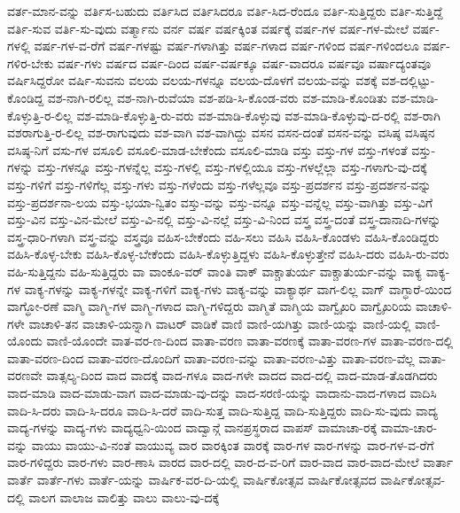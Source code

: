 {ವರ್ತ-ಮಾನ-ವನ್ನು
ವರ್ತಿಸ-ಬಹುದು
ವರ್ತಿಸಿದ
ವರ್ತಿಸಿದರೂ
ವರ್ತಿ-ಸಿದ-ರೆಂದೂ
ವರ್ತಿ-ಸುತ್ತಿದ್ದರು
ವರ್ತಿ-ಸುತ್ತಿದ್ದೆ
ವರ್ತಿ-ಸುವ
ವರ್ತಿ-ಸು-ವುದು
ವರ್ತ್ಮಾನು
ವರ್ನ
ವರ್ಷ
ವರ್ಷಕ್ಕಿಂತ
ವರ್ಷಕ್ಕೆ
ವರ್ಷ-ಗಳ
ವರ್ಷ-ಗಳ-ಮೇಲೆ
ವರ್ಷ-ಗಳಲ್ಲಿ
ವರ್ಷ-ಗಳ-ವ-ರೆಗೆ
ವರ್ಷ-ಗಳಷ್ಟು
ವರ್ಷ-ಗಳಾಗಿತ್ತು
ವರ್ಷ-ಗಳಾದ
ವರ್ಷ-ಗಳಿಂದ
ವರ್ಷ-ಗಳಿಂದಲೂ
ವರ್ಷ-ಗಳಿರ-ಬೇಕು
ವರ್ಷ-ಗಳು
ವರ್ಷದ
ವರ್ಷ-ದಿಂದ
ವರ್ಷ-ವರ್ಷಕ್ಕೂ
ವರ್ಷ-ವಾದರೂ
ವರ್ಷವೂ
ವರ್ಷಾದ್ಯಂತವೂ
ವರ್ಷಿಸಿದ್ದರೋ
ವರ್ಷಿ-ಸುವನು
ವಲಯ
ವಲಯ-ಗಳನ್ನೂ
ವಲಯ-ದೊಳಗೆ
ವಲಯ-ವನ್ನು
ವಶಕ್ಕೆ
ವಶ-ದಲ್ಲಿಟ್ಟು-ಕೊಂಡಿದ್ದ
ವಶ-ನಾಗಿ-ರಲಿಲ್ಲ
ವಶ-ನಾಗಿ-ರುವೆಯಾ
ವಶ-ಪಡಿ-ಸಿ-ಕೊಂಡ-ವರು
ವಶ-ಮಾಡಿ-ಕೊಂಡಿತು
ವಶ-ಮಾಡಿ-ಕೊಳ್ಳುತ್ತಿ-ರ-ಲಿಲ್ಲ
ವಶ-ಮಾಡಿ-ಕೊಳ್ಳುತ್ತಿ-ರು-ವರು
ವಶ-ಮಾಡಿ-ಕೊಳ್ಳುವು
ವಶ-ಮಾಡಿ-ಕೊಳ್ಳುವು-ದ-ರಲ್ಲಿ
ವಶ-ರಾಗಿ
ವಶರಾಗುತ್ತಿ-ರ-ಲಿಲ್ಲ
ವಶ-ರಾಗುವುದು
ವಶ-ವಾಗಿ
ವಶ-ವಾಗಿದ್ದು
ವಸನ
ವಸನ-ದಂತೆ
ವಸನ-ವನ್ನು
ವಸಿಷ್ಠ
ವಸಿಷ್ಠನ
ವಸಿಷ್ಠ-ನಿಗೆ
ವಸು-ಗಳ
ವಸೂಲಿ
ವಸೂಲಿ-ಮಾಡ-ಬೇಕೆಂದು
ವಸೂಲಿ-ಮಾಡಿ
ವಸ್ತು
ವಸ್ತು-ಗಳ
ವಸ್ತು-ಗಳಂತೆ
ವಸ್ತು-ಗಳನ್ನು
ವಸ್ತು-ಗಳನ್ನೂ
ವಸ್ತು-ಗಳನ್ನೆಲ್ಲ
ವಸ್ತು-ಗಳಲ್ಲಿ
ವಸ್ತು-ಗಳಲ್ಲಿಯೂ
ವಸ್ತು-ಗಳಲ್ಲೆಲ್ಲಾ
ವಸ್ತು-ಗಳಾಗು-ವು-ದಕ್ಕೆ
ವಸ್ತು-ಗಳಿಗೆ
ವಸ್ತು-ಗಳಿಗೆಲ್ಲ
ವಸ್ತು-ಗಳು
ವಸ್ತು-ಗಳೆಂದು
ವಸ್ತು-ಗಳೆಲ್ಲವೂ
ವಸ್ತು-ಪ್ರದರ್ಶನ
ವಸ್ತು-ಪ್ರದರ್ಶನ-ವನ್ನು
ವಸ್ತು-ಪ್ರದರ್ಶನಾ-ಲಯ
ವಸ್ತು-ಭಯಾ-ನ್ವಿತಂ
ವಸ್ತು-ವನ್ನು
ವಸ್ತು-ವನ್ನೂ
ವಸ್ತು-ವನ್ನೆಲ್ಲ
ವಸ್ತು-ವಾಗಿತ್ತು
ವಸ್ತು-ವಿಗೆ
ವಸ್ತು-ವಿನ
ವಸ್ತು-ವಿನ-ಮೇಲೆ
ವಸ್ತು-ವಿ-ನಲ್ಲಿ
ವಸ್ತು-ವಿ-ನಲ್ಲೆ
ವಸ್ತು-ವಿ-ನಿಂದ
ವಸ್ತ್ರ
ವಸ್ತ್ರ-ದಂತೆ
ವಸ್ತ್ರ-ದಾನಾದಿ-ಗಳನ್ನು
ವಸ್ತ್ರ-ಧಾರಿ-ಗಳಾಗಿ
ವಸ್ತ್ರ-ವನ್ನು
ವಸ್ತ್ರವೂ
ವಹಿಸ-ಬೇಕೆಂದು
ವಹಿ-ಸಲು
ವಹಿಸಿ
ವಹಿಸಿ-ಕೊಂಡಳು
ವಹಿಸಿ-ಕೊಂಡಿದ್ದರು
ವಹಿಸಿ-ಕೊಳ್ಳ-ಬೇಕು
ವಹಿಸಿ-ಕೊಳ್ಳ-ಬೇಕೆಂದು
ವಹಿಸಿ-ಕೊಳ್ಳುತ್ತಿದ್ದಳು
ವಹಿಸಿ-ಕೊಳ್ಳುತ್ತೇನೆ
ವಹಿಸಿ-ದರು
ವಹಿಸಿ-ರು-ವರು
ವಹಿ-ಸುತ್ತಿದ್ದನು
ವಹಿ-ಸುತ್ತಿದ್ದರು
ವಾ
ವಾಂಕೂ-ವರ್
ವಾಂತಿ
ವಾಕ್
ವಾಕ್ಚಾತುರ್ಯ
ವಾಕ್ಚಾತುರ್ಯ-ವನ್ನು
ವಾಕ್ಯ
ವಾಕ್ಯ-ಗಳ
ವಾಕ್ಯ-ಗಳನ್ನು
ವಾಕ್ಯ-ಗಳನ್ನೇ
ವಾಕ್ಯ-ಗಳಿಗೆ
ವಾಕ್ಯ-ಗಳು
ವಾಕ್ಯ-ವನ್ನು
ವಾಕ್ಯಾರ್ಥ
ವಾಗ-ಲಿಲ್ಲ
ವಾಗ್
ವಾಗ್ಧಾರೆ-ಯಿಂದ
ವಾಗ್ಧೋ-ರಣೆ
ವಾಗ್ಮಿ
ವಾಗ್ಮಿ-ಗಳ
ವಾಗ್ಮಿ-ಗಳಾದ
ವಾಗ್ಮಿ-ಗಳಿದ್ದರು
ವಾಗ್ಮಿತೆ
ವಾಗ್ಮಿಯ
ವಾಗ್ವೈಖರಿ
ವಾಗ್ವೈಖರಿಯ
ವಾಚಾಳಿ-ಗಳೇ
ವಾಚಾಳಿ-ತನ
ವಾಚಾಳಿ-ಯನ್ನಾಗಿ
ವಾಟರ್
ವಾಡಿಕೆ
ವಾಣಿ
ವಾಣಿ-ಯಗಿತ್ತು
ವಾಣಿ-ಯನ್ನು
ವಾಣಿ-ಯಲ್ಲಿ
ವಾಣಿ-ಯೊಂದು
ವಾಣಿ-ಯೊಂದೇ
ವಾತ-ವರ-ಣ-ದಿಂದ
ವಾತಾ-ವರಣ
ವಾತಾ-ವರಣಕ್ಕೆ
ವಾತಾ-ವರಣ-ಗಳ
ವಾತಾ-ವರಣ-ದಲ್ಲಿ
ವಾತಾ-ವರಣ-ದಿಂದ
ವಾತಾ-ವರಣ-ದೊಂದಿಗೆ
ವಾತಾ-ವರಣ-ವನ್ನು
ವಾತಾ-ವರಣ-ವಿತ್ತು
ವಾತಾ-ವರಣ-ವೆಲ್ಲ
ವಾತಾ-ವರಣವೇ
ವಾತ್ಸಲ್ಯ-ದಿಂದ
ವಾದ
ವಾದಕ್ಕೆ
ವಾದ-ಗಳೂ
ವಾದ-ಗಳೇ
ವಾದದ
ವಾದ-ದಲ್ಲಿ
ವಾದ-ಮಾಡ-ತೊಡಗಿದರು
ವಾದ-ಮಾಡಿ
ವಾದ-ಮಾಡು-ವಾಗ
ವಾದ-ಮಾಡು-ವು-ದನ್ನು
ವಾದ-ಸರಣಿ-ಯನ್ನು
ವಾದಾನು-ವಾದ-ಗಳಾದ
ವಾದಿಸಿ
ವಾದಿ-ಸಿ-ದರು
ವಾದಿ-ಸಿ-ದರೂ
ವಾದಿ-ಸಿ-ದರೆ
ವಾದಿ-ಸುತ್ತ
ವಾದಿ-ಸುತ್ತಿದ್ದ
ವಾದಿ-ಸುತ್ತಿದ್ದರು
ವಾದಿ-ಸು-ವುದು
ವಾದ್ಯ
ವಾದ್ಯ-ಗಳನ್ನು
ವಾದ್ಯ-ಗಳು
ವಾದ್ಯಧ್ವನಿ-ಯಿಂದ
ವಾದ್ವಾನ್ಗೆ
ವಾನಪ್ರಸ್ಥರಾದ
ವಾಪಸ್
ವಾಮಾಚಾ-ರಕ್ಕೆ
ವಾಮಾ-ಚಾರ-ವನ್ನು
ವಾಯು
ವಾಯು-ವಿ-ನಂತೆ
ವಾಯುವ್ಯ
ವಾರ
ವಾರಕ್ಕಿಂತ
ವಾರಕ್ಕೆ
ವಾರ-ಗಳ
ವಾರ-ಗಳನ್ನು
ವಾರ-ಗಳ-ವ-ರೆಗೆ
ವಾರ-ಗಳಿದ್ದರು
ವಾರ-ಗಳು
ವಾರ-ಣಾಸಿ
ವಾರದ
ವಾರ-ದಲ್ಲಿ
ವಾರ-ದ-ವ-ರಿಗೆ
ವಾರ-ವಾದ
ವಾರ-ವಾದ-ಮೇಲೆ
ವಾರ್ತಾ
ವಾರ್ತೆ
ವಾರ್ತೆ-ಗಳು
ವಾರ್ತೆ-ಯನ್ನು
ವಾರ್ಷಿಕ-ವರ-ದಿ-ಯಲ್ಲಿ
ವಾರ್ಷಿಕೋತ್ಸವ
ವಾರ್ಷಿಕೋತ್ಸವದ
ವಾರ್ಷಿಕೋತ್ಸವ-ದಲ್ಲಿ
ವಾಲಗ
ವಾಲಾಜ
ವಾಲಿತ್ತು
ವಾಲು
ವಾಲು-ವು-ದಕ್ಕೆ
}
